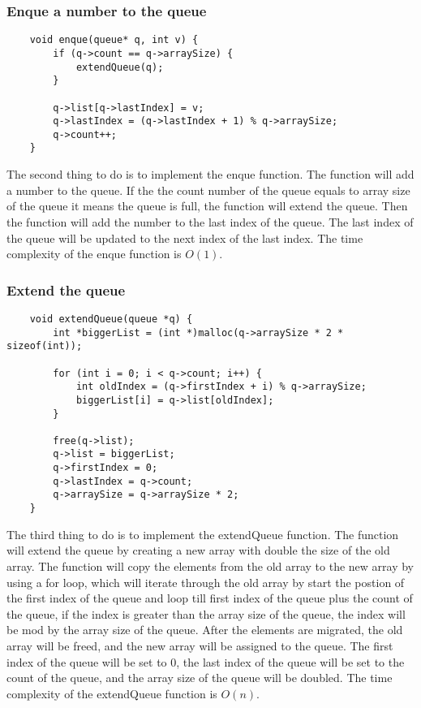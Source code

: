 \subsubsection*{Enque a number to the queue}
\begin{verbatim}
    void enque(queue* q, int v) {
        if (q->count == q->arraySize) {
            extendQueue(q);
        }
        
        q->list[q->lastIndex] = v;
        q->lastIndex = (q->lastIndex + 1) % q->arraySize; 
        q->count++;
    }
\end{verbatim}
The second thing to do is to implement the enque function. The function will add a number to the queue. If the the count number of the queue equals to array size of the queue it means the queue is full, the function will extend the queue. Then the function will add the number to the last index of the queue. The last index of the queue will be updated to the next index of the last index. The time complexity of the enque function is $O(1)$.

\subsubsection*{Extend the queue}
\begin{verbatim}
    void extendQueue(queue *q) {
        int *biggerList = (int *)malloc(q->arraySize * 2 * sizeof(int));
        
        for (int i = 0; i < q->count; i++) {
            int oldIndex = (q->firstIndex + i) % q->arraySize;
            biggerList[i] = q->list[oldIndex];
        }
        
        free(q->list);
        q->list = biggerList;
        q->firstIndex = 0;  
        q->lastIndex = q->count;  
        q->arraySize = q->arraySize * 2;
    }
\end{verbatim}
The third thing to do is to implement the extendQueue function. The function will extend the queue by creating a new array with double the size of the old array. The function will copy the elements from the old array to the new array by using a for loop, which will iterate through the old array by start the postion of the first index of the queue and loop till first index of the queue plus the count of the queue, if the index is greater than the array size of the queue, the index will be mod by the array size of the queue. After the elements are migrated, the old array will be freed, and the new array will be assigned to the queue. The first index of the queue will be set to 0, the last index of the queue will be set to the count of the queue, and the array size of the queue will be doubled. The time complexity of the extendQueue function is $O(n)$.


